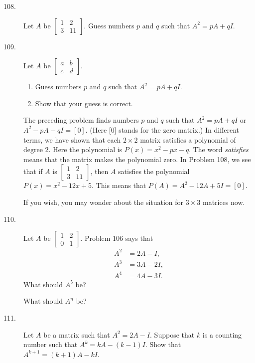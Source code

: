 \documentclass{article}
\begin{document}
\begin{description}
  \item[108.] Let $A$ be $\begin{bmatrix} 1 & 2 \\ 3 & 11 \end{bmatrix}$. Guess numbers $p$ and $q$ such that $A^2 = pA+qI$.

  \item[109.] Let $A$ be $\begin{bmatrix} a & b \\ c & d \end{bmatrix}$.
    \begin{enumerate}[\hspace{1cm}(a)]
      \item Guess numbers $p$ and $q$ such that $A^2 = pA+qI$.
      \item Show that your guess is correct.
    \end{enumerate}

  \item[] The preceding problem finds numbers $p$ and $q$ such that $A^2 = pA+qI$ or $A^2 - pA - qI = [0]$. (Here [0] stands for the zero matrix.) In different terms, we have shown that each $2 \times 2$ matrix satisfies a polynomial of degree $2$. Here the polynomial is $P(x) = x^2 - px - q$. The word \emph{satisfies} means that the matrix makes the polynomial zero. In Problem 108, we see that if $A$ is $\begin{bmatrix} 1 & 2 \\ 3 & 11 \end{bmatrix}$, then $A$ satisfies the polynomial $P(x) = x^2 - 12x + 5$. This means that $P(A) = A^2 - 12A + 5I = [0]$.

  \item[] If you wish, you may wonder about the situation for $3 \times 3$ matrices now.

  \item[110.] Let $A$ be $\begin{bmatrix} 1 & 2 \\ 0 & 1 \end{bmatrix}$. Problem 106 says that
    \begin{align*}
    A^2 & = 2A-I, \\
    A^3 & = 3A-2I, \\
    A^4 & = 4A-3I.
    \end{align*}
    What should $A^5$ be?

    What should $A^n$ be?

  \item[111.] Let $A$ be a matrix such that $A^2 = 2A-I$. Suppose that $k$ is a counting number such that $A^k = kA - (k-1)I$. Show that $A^{k+1} = (k+1)A - kI$.


\end{description}
\end{document}
